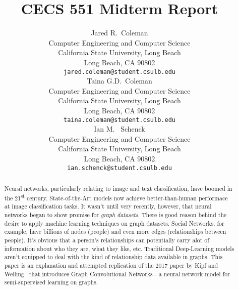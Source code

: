 \documentclass{article}
\title{CECS 551 Midterm Report}
\author{%
  Jared R.~Coleman\\
  Computer Engineering and Computer Science\\
  California State University, Long Beach\\
  Long Beach, CA 90802 \\
  \texttt{jared.coleman@student.csulb.edu} \\
  \And 
  Taina G.D.~Coleman\\
  Computer Engineering and Computer Science\\
  California State University, Long Beach\\
  Long Beach, CA 90802 \\
  \texttt{taina.coleman@student.csulb.edu} \\
  \And 
  Ian M. ~Schenck\\
  Computer Engineering and Computer Science\\
  California State University, Long Beach\\
  Long Beach, CA 90802 \\
  \texttt{ian.schenck@student.csulb.edu} \\
}
\begin{document}
\setcounter{equation}{0}

\maketitle

\begin{abstract}
  Neural networks, particularly relating to image and text classification, have boomed in the 21\textsuperscript{st} century. State-of-the-Art models now achieve better-than-human performace at image classification tasks. It wasn't until very recently, however, that neural networks began to show promise for \textit{graph datasets}. There is good reason behind the desire to apply machine learning techniques on graph datasets. Social Networks, for example, have billions of nodes (people) and even more edges (relationships between people). It's obvious that a person's relationships can potentially carry alot of information about who they are, what they like, etc. Traditional Deep-Learning models aren't equipped to deal with the kind of relationship data available in graphs. This paper is an explanation and attempted replication of the 2017 paper by Kipf and Welling~\cite{Kipf2016} that introduces Graph Convolutional Networks - a neural network model for semi-supervised learning on graphs.
\end{abstract}

 




  


\end{document}
